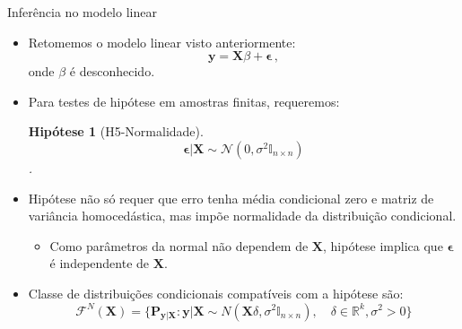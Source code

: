 \documentclass[11pt]{beamer}
\newtheorem{assumption}{Hipótese}
\begin{document}
\begin{frame}{Inferência no modelo linear}
\begin{itemize}
	\item Retomemos o modelo linear visto anteriormente:
$$\boldsymbol{y} =\boldsymbol{X}\beta + \boldsymbol{\epsilon}\, ,$$
onde $\beta$ é desconhecido.
\item Para testes de hipótese em amostras finitas, requeremos:
\begin{assumption}[H5-Normalidade]
$$\boldsymbol{\epsilon}|\boldsymbol{X}\sim \mathcal{N}(0,\sigma^2 \mathbb{I}_{n\times n})$$.
\end{assumption}
\item Hipótese não só requer que erro tenha média condicional zero e matriz de variância homocedástica, mas impõe normalidade da distribuição condicional.
\begin{itemize}
	\item Como parâmetros da normal não dependem de $\boldsymbol{X}$, hipótese implica que $\boldsymbol{\epsilon}$ é independente de $\boldsymbol{X}$.
\end{itemize}
\item Classe de distribuições condicionais compatíveis com a hipótese são:
$$\mathcal{F}^N(\boldsymbol{X}) = \{\boldsymbol{P}_{\boldsymbol{y}|\boldsymbol{X}}: \boldsymbol{y}|\boldsymbol{X}\sim N(\boldsymbol{X}\delta, \sigma^2 \mathbb{I}_{n\times n}),\quad \delta \in \mathbb{R}^k, \sigma^2>0\}$$ 
\end{itemize}
\end{frame}
\end{document}
